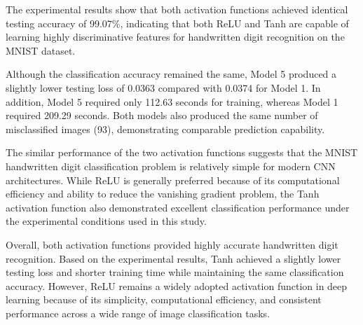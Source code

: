 The experimental results show that both activation functions achieved identical testing accuracy of 99.07\%, indicating that both ReLU and Tanh are capable of learning highly discriminative features for handwritten digit recognition on the MNIST dataset.

Although the classification accuracy remained the same, Model 5 produced a slightly lower testing loss of 0.0363 compared with 0.0374 for Model 1. In addition, Model 5 required only 112.63 seconds for training, whereas Model 1 required 209.29 seconds. Both models also produced the same number of misclassified images (93), demonstrating comparable prediction capability.

The similar performance of the two activation functions suggests that the MNIST handwritten digit classification problem is relatively simple for modern CNN architectures. While ReLU is generally preferred because of its computational efficiency and ability to reduce the vanishing gradient problem, the Tanh activation function also demonstrated excellent classification performance under the experimental conditions used in this study.

Overall, both activation functions provided highly accurate handwritten digit recognition. Based on the experimental results, Tanh achieved a slightly lower testing loss and shorter training time while maintaining the same classification accuracy. However, ReLU remains a widely adopted activation function in deep learning because of its simplicity, computational efficiency, and consistent performance across a wide range of image classification tasks.